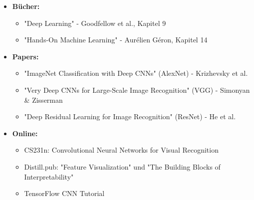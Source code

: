 \documentclass[12pt,a4paper]{article}
\begin{document}
\begin{itemize}
    \item \textbf{Bücher:}
    \begin{itemize}
        \item "Deep Learning" - Goodfellow et al., Kapitel 9
        \item "Hands-On Machine Learning" - Aurélien Géron, Kapitel 14
    \end{itemize}
    \item \textbf{Papers:}
    \begin{itemize}
        \item "ImageNet Classification with Deep CNNs" (AlexNet) - Krizhevsky et al.
        \item "Very Deep CNNs for Large-Scale Image Recognition" (VGG) - Simonyan \& Zisserman
        \item "Deep Residual Learning for Image Recognition" (ResNet) - He et al.
    \end{itemize}
    \item \textbf{Online:}
    \begin{itemize}
        \item CS231n: Convolutional Neural Networks for Visual Recognition
        \item Distill.pub: "Feature Visualization" und "The Building Blocks of Interpretability"
        \item TensorFlow CNN Tutorial
    \end{itemize}
\end{itemize}
\end{document}
